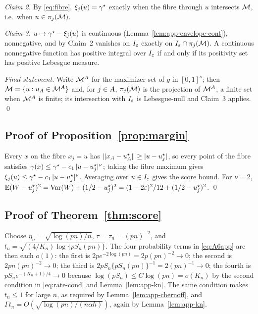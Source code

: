 \emph{Claim 2.}  By \eqref{eq:fibre}, $\xi_j(u)=\gamma^\star$ exactly when the
fibre through $u$ intersects $\mathcal{M}$, i.e.\ when $u\in\pi_j(\mathcal{M})$.

\emph{Claim 3.}  $u\mapsto\gamma^\star-\xi_j(u)$ is continuous
(Lemma~\ref{lem:app-envelope-cont}), nonnegative, and by Claim~2 vanishes
on $I_\varepsilon$ exactly on $I_\varepsilon\cap\pi_j(\mathcal{M})$.  A continuous nonnegative function
has positive integral over $I_\varepsilon$ if and only if its positivity set has
positive Lebesgue measure.

\emph{Final statement.}  Write $\mathcal{M}^{A}$ for the maximizer set of $g$ in
$[0,1]^{s}$; then $\mathcal{M}=\{u:u_{A}\in\mathcal{M}^{A}\}$ and, for $j\in A$,
$\pi_j(\mathcal{M})$ is the projection of $\mathcal{M}^{A}$, a finite set when $\mathcal{M}^{A}$ is
finite; its intersection with $I_\varepsilon$ is Lebesgue-null and Claim~3 applies.
\qed

\subsection{Proof of Proposition~\ref{prop:margin}}

Every $x$ on the fibre $x_j=u$ has
$\|x_{A}-u^\star_{A}\|\ge|u-u^\star_j|$, so every point of the fibre
satisfies
$\gamma(x)\le\gamma^\star-c_1\,|u-u^\star_j|^\nu$; taking the fibre maximum
gives $\xi_j(u)\le\gamma^\star-c_1\,|u-u^\star_j|^\nu$.  Averaging
over $u\in I_\varepsilon$ gives the score bound.  For $\nu=2$,
$\mathbb E(W-u_j^\star)^2=\mathrm{Var}(W)+(1/2-u_j^\star)^2
=(1-2\varepsilon)^2/12+(1/2-u_j^\star)^2$.  \qed

\subsection{Proof of Theorem~\ref{thm:score}}

Choose $\eta_n=\sqrt{\log(pn)/n}$, $\tau=\tau_n=(pn)^{-2}$, and
$t_n=\sqrt{(4/K_n)\log\{pS_n(pn)\}}$.  The four probability terms in
\eqref{eq:A6app} are then each $o(1)$: the first is
$2pe^{-2\log(pn)}=2p(pn)^{-2}\to0$; the second is $2pn(pn)^{-2}\to0$; the
third is $2pS_n\{pS_n(pn)\}^{-1}=2(pn)^{-1}\to0$; the fourth is
$pS_ne^{-(K_n+1)/4}\to0$ because $\log(pS_n)\le C\log(pn)=o(K_n)$ by the
second condition in \eqref{eq:rate-cond} and
Lemma~\ref{lem:app-kn}.  The same condition makes $t_n\le1$ for large
$n$, as required by Lemma~\ref{lem:app-chernoff}, and
$\Gamma t_n=O(\sqrt{\log(pn)/(n\alpha h)})$, again by
Lemma~\ref{lem:app-kn}.

